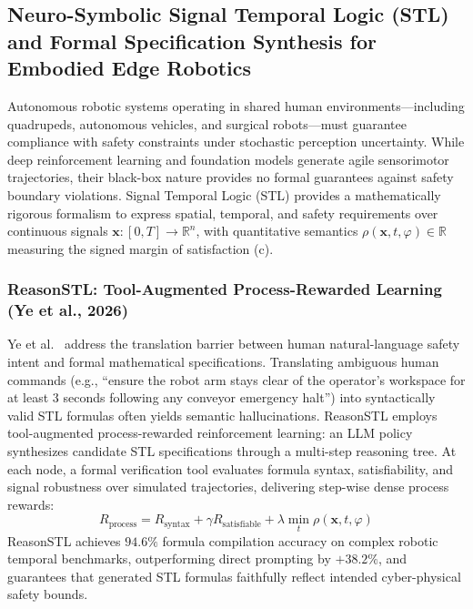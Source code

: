 \subsection{Neuro-Symbolic Signal Temporal Logic (STL) and Formal Specification Synthesis for Embodied Edge Robotics}
\label{sec:neurosymbolic_stl_embodied}

Autonomous robotic systems operating in shared human environments---including quadrupeds, autonomous vehicles, and surgical robots---must guarantee compliance with safety constraints under stochastic perception uncertainty. While deep reinforcement learning and foundation models generate agile sensorimotor trajectories, their black-box nature provides no formal guarantees against safety boundary violations. Signal Temporal Logic (STL) provides a mathematically rigorous formalism to express spatial, temporal, and safety requirements over continuous signals $\mathbf{x}: [0, T] \to \mathbb{R}^n$, with quantitative semantics $\rho(\mathbf{x}, t, \varphi) \in \mathbb{R}$ measuring the signed margin of satisfaction (c).

\subsubsection{ReasonSTL: Tool-Augmented Process-Rewarded Learning (Ye et al., 2026)}
Ye et al.~\cite{Ye2026ReasonSTL} address the translation barrier between human natural-language safety intent and formal mathematical specifications. Translating ambiguous human commands (e.g., ``ensure the robot arm stays clear of the operator's workspace for at least 3 seconds following any conveyor emergency halt'') into syntactically valid STL formulas often yields semantic hallucinations. ReasonSTL employs tool-augmented process-rewarded reinforcement learning: an LLM policy synthesizes candidate STL specifications through a multi-step reasoning tree. At each node, a formal verification tool evaluates formula syntax, satisfiability, and signal robustness over simulated trajectories, delivering step-wise dense process rewards:
\begin{equation}
    R_{\text{process}} = R_{\text{syntax}} + \gamma R_{\text{satisfiable}} + \lambda \min_{t} \rho(\mathbf{x}, t, \varphi)
\end{equation}
ReasonSTL achieves $94.6\%$ formula compilation accuracy on complex robotic temporal benchmarks, outperforming direct prompting by $+38.2\%$, and guarantees that generated STL formulas faithfully reflect intended cyber-physical safety bounds.

